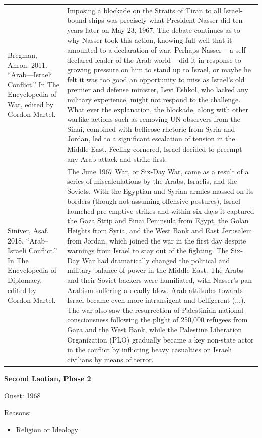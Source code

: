 {\begin{longtable}{p{}p{}}
\\
Bregman, Ahron. 2011. “Arab—Israeli Conflict.” In The Encyclopedia of War, edited by Gordon Martel. & Imposing a blockade on the Straits of Tiran to all Israel-bound ships was precisely what President Nasser did ten years later on May 23, 1967. The debate continues as to why Nasser took this action, knowing full well that it amounted to a declaration of war. Perhaps Nasser – a self-declared leader of the Arab world – did it in response to growing pressure on him to stand up to Israel, or maybe he felt it was too good an opportunity to miss as Israel's old premier and defense minister, Levi Eshkol, who lacked any military experience, might not respond to the challenge. What ever the explanation, the blockade, along with other warlike actions such as removing UN observers from the Sinai, combined with bellicose rhetoric from Syria and Jordan, led to a significant escalation of tension in the Middle East. Feeling cornered, Israel decided to preempt any Arab attack and strike first.
\\
Siniver, Asaf. 2018. “Arab–Israeli Conflict.” In The Encyclopedia of Diplomacy, edited by Gordon Martel. & The June 1967 War, or Six-Day War, came as a result of a series of miscalculations by the Arabs, Israelis, and the Soviets. With the Egyptian and Syrian armies massed on its borders (though not assuming offensive postures), Israel launched pre-emptive strikes and within six days it captured the Gaza Strip and Sinai Peninsula from Egypt, the Golan Heights from Syria, and the West Bank and East Jerusalem from Jordan, which joined the war in the first day despite warnings from Israel to stay out of the fighting. The Six-Day War had dramatically changed the political and military balance of power in the Middle East. The Arabs and their Soviet backers were humiliated, with Nasser's pan-Arabism suffering a deadly blow. Arab attitudes towards Israel became even more intransigent and belligerent (...). The war also saw the resurrection of Palestinian national consciousness following the plight of 250,000 refugees from Gaza and the West Bank, while the Palestine Liberation Organization (PLO) gradually became a key non-state actor in the conflict by inflicting heavy casualties on Israeli civilians by means of terror.
\\
\end{longtable}}
\clearpage
         \textbf{Second Laotian, Phase 2} 

          \underline{Onset:} 1968         

\underline{Reasons:}
\begin{itemize}
\item Religion or Ideology
\end{itemize}

